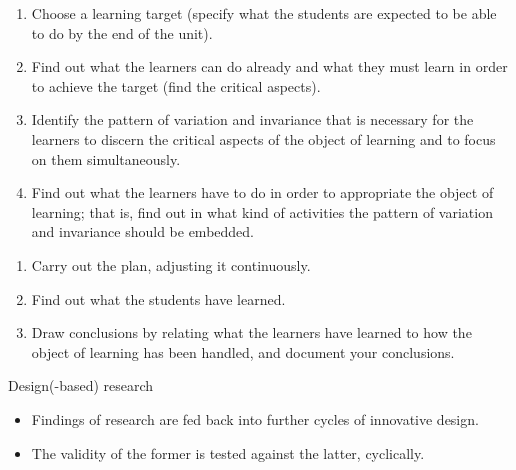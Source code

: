 \begin{frame}
  \begin{example}
    \begin{enumerate}
      \item<+> Choose a learning target (specify what the students are expected 
        to be able to do by the end of the unit).
      \item<+> Find out what the learners can do already and what they must 
        learn in order to achieve the target (find the critical aspects).
      \item<+> Identify the pattern of variation and invariance that is 
        necessary for the learners to discern the critical aspects of the 
        object of learning and to focus on them simultaneously.
      \item<+> Find out what the learners have to do in order to appropriate 
        the object of learning; that is, find out in what kind of activities 
        the pattern of variation and invariance should be embedded.
        \saveenumi
    \end{enumerate}
  \end{example}
\end{frame}

\begin{frame}
  \begin{example}
    \begin{enumerate}
      \resumeenumi
      \item<+> Carry out the plan, adjusting it continuously.
      \item<+> Find out what the students have learned.
      \item<+> Draw conclusions by relating what the learners have learned to 
        how the object of learning has been handled, and document your 
        conclusions.
    \end{enumerate}
  \end{example}
\end{frame}

\begin{frame}
  \begin{block}{Design(-based) 
    research~{\cite[p.~259]{NecessaryConditionsOfLearning}}}
    \begin{itemize}
      \item Findings of research are fed back into further cycles of innovative 
        design.
      \item The validity of the former is tested against the latter, 
        cyclically.
    \end{itemize}
  \end{block}
\end{frame}

